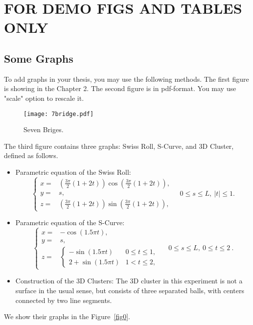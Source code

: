 %


\chapter{FOR DEMO FIGS AND TABLES ONLY}
\label{cha:demos}

 \vspace{-12pt}
\section{Some Graphs}\label{sec:some}
To add graphs in your thesis, you may use the following methods. The first figure is showing in the Chapter 2. The second figure is in pdf-format. You may use "scale" option to rescale it.
\begin{figure}[htb]
\begin{center}
\texttt{[image: 7bridge.pdf]}\label{Fig:2}
\caption{Seven Briges.}
\end{center}
\end{figure}

The third figure contains three graphs: Swiss Roll, S-Curve, and 3D Cluster, defined as follows.
\begin{itemize}
\item Parametric equation of the Swiss Roll:
\[
\begin{cases}
  x = &  (\frac{3\pi}{2}(1+2t))\cos(\frac{3\pi}{2}(1+2t)),\\
  y = &  s,\\
  z = &  (\frac{3\pi}{2}(1+2t))\sin(\frac{3\pi}{2}(1+2t)),
  \end{cases}
  \quad 0\le s \le L,\ \vert t \vert \le 1.
\]
\item Parametric equation of the S-Curve:
\[
\begin{cases}
   x = & -\cos(1.5\pi t),  \\
   y = &  s,\\
   z = & \begin{cases}
                -\sin(1.5\pi t) &  0\le t \le 1,\\
                2+\sin(1.5 \pi t) & 1< t\le 2,
         \end{cases}
\end{cases}
     \quad 0\le s \le L,\  0 \le t \le 2\ .
\]
\item Construction of the 3D Clusters: The 3D cluster in this experiment is not a surface in the usual sense, but consists of three separated balls, with centers connected by two line segments.
\end{itemize}
We show their graphs in the Figure~\ref{fig0}.

